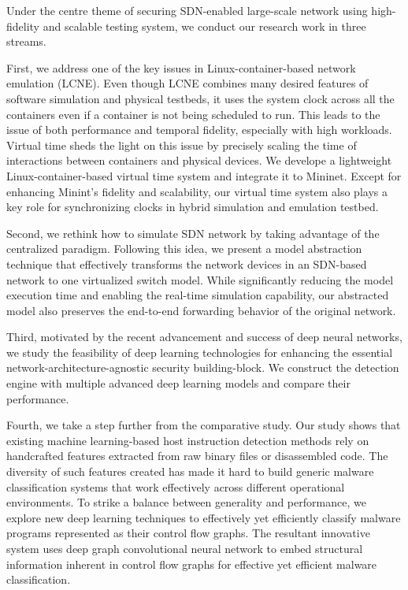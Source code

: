 Under the centre theme of securing SDN-enabled large-scale network using high-fidelity and scalable testing system, we conduct our research work in three streams.

First, we address one of the key issues in Linux-container-based network emulation (LCNE).
Even though LCNE combines many desired features of software simulation and physical testbeds,
it uses the system clock across all the containers even if a container is not being scheduled to run.
This leads to the issue of both performance and temporal fidelity, especially with high workloads.
Virtual time sheds the light on this issue by precisely scaling the time of interactions between containers and physical devices.
We develope a lightweight Linux-container-based virtual time system and integrate it to Mininet.
Except for enhancing Minint's fidelity and scalability,
our virtual time system also plays a key role for synchronizing clocks in hybrid simulation and emulation testbed.

Second, we rethink how to simulate SDN network by taking advantage of the centralized paradigm.
Following this idea, we present a model abstraction technique that effectively transforms
the network devices in an SDN-based network to one virtualized switch model.
While significantly reducing the model execution time and enabling the real-time simulation capability,
our abstracted model also preserves the end-to-end forwarding behavior of the original network.

Third, motivated by the recent advancement and success of deep neural networks,
we study the feasibility of deep learning technologies for enhancing the essential network-architecture-agnostic security building-block.
We construct the detection engine with multiple advanced deep learning models and compare their performance.

Fourth, we take a step further from the comparative study.
Our study shows that existing machine learning-based host instruction detection methods rely on handcrafted features extracted from raw binary files or disassembled code.
The diversity of such features created has made it hard to build generic malware classification systems that
work effectively across different operational environments.
To strike a balance between generality and performance,
we explore new deep learning techniques to effectively yet efficiently classify malware programs represented as their control flow graphs.
The resultant innovative system uses deep graph convolutional neural network to
embed structural information inherent in control flow graphs for effective yet efficient malware classification.

